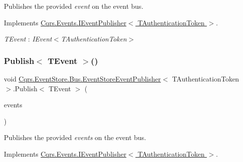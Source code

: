 Publishes the provided {\itshape event}  on the event bus. 



Implements \hyperlink{interfaceCqrs_1_1Events_1_1IEventPublisher_a02f0db0bc9b3aa1c7f766f58f8422ee3_a02f0db0bc9b3aa1c7f766f58f8422ee3}{Cqrs.\+Events.\+I\+Event\+Publisher$<$ T\+Authentication\+Token $>$}.

\begin{Desc}
\item[Type Constraints]\begin{description}
\item[{\em T\+Event} : {\em I\+Event$<$T\+Authentication\+Token$>$}]\end{description}
\end{Desc}
\mbox{\label{classCqrs_1_1EventStore_1_1Bus_1_1EventStoreEventPublisher_a85b4922ff01b088b01b39463681c6eb6_a85b4922ff01b088b01b39463681c6eb6}} 
\subsubsection{\texorpdfstring{Publish$<$ T\+Event $>$()}{Publish< TEvent >()}\hspace{0.1cm}{\footnotesize\ttfamily [2/2]}}
{\footnotesize\ttfamily void \hyperlink{classCqrs_1_1EventStore_1_1Bus_1_1EventStoreEventPublisher}{Cqrs.\+Event\+Store.\+Bus.\+Event\+Store\+Event\+Publisher}$<$ T\+Authentication\+Token $>$.Publish$<$ T\+Event $>$ (\begin{DoxyParamCaption}\item[{I\+Enumerable$<$ T\+Event $>$}]{events }\end{DoxyParamCaption})}



Publishes the provided {\itshape events}  on the event bus. 



Implements \hyperlink{interfaceCqrs_1_1Events_1_1IEventPublisher_a2cbcc3d2c24d015abef6337714ec51ff_a2cbcc3d2c24d015abef6337714ec51ff}{Cqrs.\+Events.\+I\+Event\+Publisher$<$ T\+Authentication\+Token $>$}.

